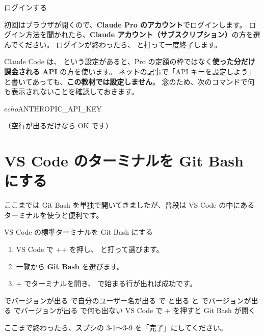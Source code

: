 \begin{step}{ログインする}
初回はブラウザが開くので、\textbf{Claude Pro のアカウント}でログインします。
ログイン方法を聞かれたら、\textbf{Claude アカウント（サブスクリプション）}の方を選んでください。
ログインが終わったら、 と打って一度終了します。
\end{step}

\begin{caution}
Claude Code は、 という設定があると、Pro の定額の枠ではなく\textbf{使った分だけ課金される API} の方を使います。
ネットの記事で「API キーを設定しよう」と書いてあっても、\textbf{この教材では設定しません}。
念のため、次のコマンドで何も表示されないことを確認しておきます。
\begin{terminal}
$ echo $ANTHROPIC_API_KEY

\end{terminal}
（空行が出るだけなら OK です）
\end{caution}

\section{VS Code のターミナルを Git Bash にする}

ここまでは Git Bash を単独で開いてきましたが、普段は VS Code の中にあるターミナルを使うと便利です。

\begin{step}{VS Code の標準ターミナルを Git Bash にする}
\begin{enumerate}
  \item VS Code で ++ を押し、 と打って選びます。
  \item 一覧から \textbf{Git Bash} を選びます。
  \item {}+ でターミナルを開き、\code{\$} で始まる行が出れば成功です。
\end{enumerate}
\end{step}

\begin{checklist}
\begin{itemize}
  \checkitem {} でバージョンが出る
  \checkitem {} で自分のユーザー名が出る
  \checkitem {} で  と出る
  \checkitem {} と  でバージョンが出る
  \checkitem {} でバージョンが出る
  \checkitem {} で何も出ない
  \checkitem VS Code で + を押すと Git Bash が開く
\end{itemize}
ここまで終わったら、スプシの 3-1〜3-9 を「完了」にしてください。
\end{checklist}
